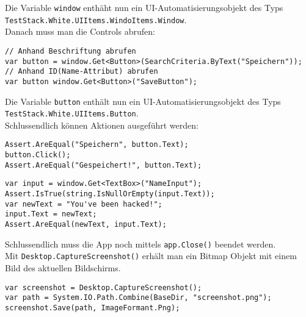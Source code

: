 Die Variable \verb+window+ enthäht nun ein UI-Automatisierungsobjekt des Typs \verb+TestStack.White.UIItems.WindoItems.Window+.\\
Danach muss man die Controls abrufen:
\begin{lstlisting}
// Anhand Beschriftung abrufen
var button = window.Get<Button>(SearchCriteria.ByText("Speichern"));
// Anhand ID(Name-Attribut) abrufen
var button window.Get<Button>("SaveButton");
\end{lstlisting}
Die Variable \verb+button+ enthält nun ein UI-Automatisierungsobjekt des Typs \verb+TestStack.White.UIItems.Button+.\\
Schlussendlich können Aktionen ausgeführt werden:
\begin{lstlisting}
Assert.AreEqual("Speichern", button.Text);
button.Click();
Assert.AreEqual("Gespeichert!", button.Text);
\end{lstlisting}
\begin{lstlisting}
var input = window.Get<TextBox>("NameInput");
Assert.IsTrue(string.IsNullOrEmpty(input.Text));
var newText = "You've been hacked!";
input.Text = newText;
Assert.AreEqual(newText, input.Text);
\end{lstlisting}
Schlussendlich muss die App noch mittels \verb+app.Close()+ beendet werden.\\
Mit \verb+Desktop.CaptureScreenshot()+ erhält man ein Bitmap Objekt mit einem Bild des aktuellen Bildschirms.
\begin{lstlisting}
var screenshot = Desktop.CaptureScreenshot();
var path = System.IO.Path.Combine(BaseDir, "screenshot.png");
screenshot.Save(path, ImageFormant.Png);
\end{lstlisting}

